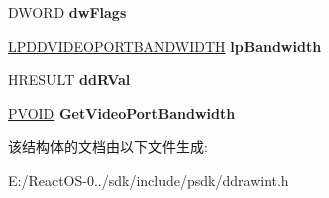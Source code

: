 \begin{DoxyCompactItemize}
\mbox{\label{struct___d_d___g_e_t_v_p_o_r_t_b_a_n_d_w_i_d_t_h_d_a_t_a_aca1d1e1cee8b13b8310e5b7b5899c1c1}} 
D\+W\+O\+RD {\bfseries dw\+Flags}
\item 
\mbox{\label{struct___d_d___g_e_t_v_p_o_r_t_b_a_n_d_w_i_d_t_h_d_a_t_a_a40ecd8ade40b0046663ca36b9d35f2bb}} 
\hyperlink{struct___d_d_v_i_d_e_o_p_o_r_t_b_a_n_d_w_i_d_t_h}{L\+P\+D\+D\+V\+I\+D\+E\+O\+P\+O\+R\+T\+B\+A\+N\+D\+W\+I\+D\+TH} {\bfseries lp\+Bandwidth}
\item 
\mbox{\label{struct___d_d___g_e_t_v_p_o_r_t_b_a_n_d_w_i_d_t_h_d_a_t_a_ac8945b203aad7b456de9aca4c8f4becb}} 
H\+R\+E\+S\+U\+LT {\bfseries dd\+R\+Val}
\item 
\mbox{\label{struct___d_d___g_e_t_v_p_o_r_t_b_a_n_d_w_i_d_t_h_d_a_t_a_ada08af16ef12bbe63622926ab00117b3}} 
\hyperlink{interfacevoid}{P\+V\+O\+ID} {\bfseries Get\+Video\+Port\+Bandwidth}
\end{DoxyCompactItemize}


该结构体的文档由以下文件生成\+:\begin{DoxyCompactItemize}
\item 
E\+:/\+React\+O\+S-\/0../sdk/include/psdk/ddrawint.\+h\end{DoxyCompactItemize}
